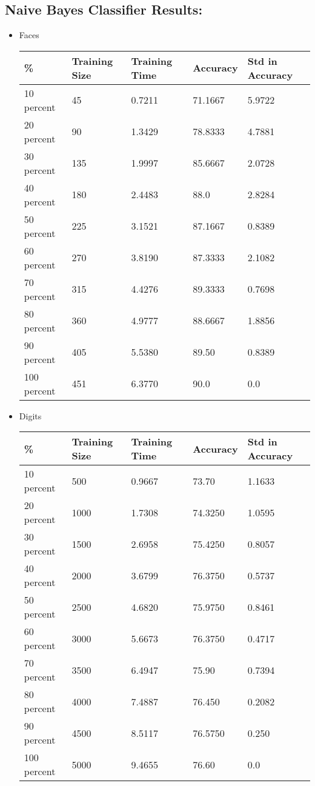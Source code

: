 \documentclass[11]{article}
\begin{document}
\subsection*{Naive Bayes Classifier Results:}
\begin{itemize}
\item Faces
	\begin{center}
    		\begin{tabular}{ | l | l | l | l | p{5cm} |}
    		\hline
    		 \% & Training Size & Training Time & Accuracy & Std in Accuracy \\ \hline
    		10 percent & 45 & 0.7211 & 71.1667 & 5.9722 \\ \hline
    		20 percent & 90 & 1.3429 & 78.8333 & 4.7881 \\ \hline
    		30 percent & 135 & 1.9997 & 85.6667 & 2.0728 \\ \hline
    		40 percent & 180 & 2.4483 & 88.0 & 2.8284 \\ \hline
    		50 percent & 225 & 3.1521 & 87.1667 & 0.8389 \\ \hline
    		60 percent & 270 & 3.8190 & 87.3333 & 2.1082 \\ \hline
    		70 percent & 315 & 4.4276 & 89.3333 & 0.7698 \\ \hline
    		80 percent & 360 & 4.9777 & 88.6667 & 1.8856 \\ \hline
    		90 percent & 405 & 5.5380 & 89.50 & 0.8389 \\ \hline
    		100 percent & 451 & 6.3770 & 90.0 & 0.0 \\
    		\hline
    		\end{tabular}
	\end{center}
	
\item Digits
	\begin{center}
    		\begin{tabular}{ | l | l | l | l | p{5cm} |}
    		\hline
    		 \% & Training Size & Training Time & Accuracy & Std in Accuracy \\ \hline
    		10 percent & 500 & 0.9667 & 73.70 & 1.1633 \\ \hline
    		20 percent & 1000 & 1.7308 & 74.3250 & 1.0595 \\ \hline
    		30 percent & 1500 & 2.6958 & 75.4250 & 0.8057 \\ \hline
    		40 percent & 2000 & 3.6799 & 76.3750 & 0.5737 \\ \hline
    		50 percent & 2500 & 4.6820 & 75.9750 & 0.8461 \\ \hline
    		60 percent & 3000 & 5.6673 & 76.3750 & 0.4717 \\ \hline
    		70 percent & 3500 & 6.4947 & 75.90 & 0.7394 \\ \hline
    		80 percent & 4000 & 7.4887 & 76.450 & 0.2082 \\ \hline
    		90 percent & 4500 & 8.5117 & 76.5750 & 0.250 \\ \hline
    		100 percent & 5000 & 9.4655 & 76.60 & 0.0 \\
    		\hline
    		\end{tabular}
	\end{center}
\end{itemize}
\end{document}
